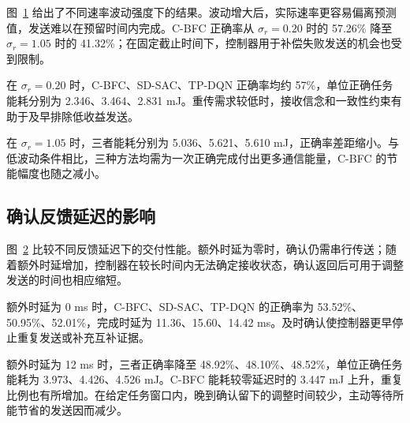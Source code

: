 图~\ref{rq3:fig:fading} 给出了不同速率波动强度下的结果。波动增大后，实际速率更容易偏离预测值，发送难以在预留时间内完成。C-BFC 正确率从 $\sigma_r=0.20$ 时的 57.26\% 降至 $\sigma_r=1.05$ 时的 41.32\%；在固定截止时间下，控制器用于补偿失败发送的机会也受到限制。

\begin{figure}[!htbp]
  \centering
  \par{}
  \label{rq3:fig:fading}
\end{figure}

在 $\sigma_r=0.20$ 时，C-BFC、SD-SAC、TP-DQN 正确率均约 57\%，单位正确任务能耗分别为 2.346、3.464、2.831 mJ。重传需求较低时，接收信念和一致性约束有助于及早排除低收益发送。

在 $\sigma_r=1.05$ 时，三者能耗分别为 5.036、5.621、5.610 mJ，正确率差距缩小。与低波动条件相比，三种方法均需为一次正确完成付出更多通信能量，C-BFC 的节能幅度也随之减小。

\FloatBarrier
\subsection{确认反馈延迟的影响}
\label{rq3:subsec:feedback-results}

图~\ref{rq3:fig:feedback} 比较不同反馈延迟下的交付性能。额外时延为零时，确认仍需串行传送；随着额外时延增加，控制器在较长时间内无法确定接收状态，确认返回后可用于调整发送的时间也相应缩短。

\begin{figure}[!htbp]
  \centering
  \par\vspace{2pt}{\footnotesize 四个子图依次对应正确完成率、单位正确任务能耗、重复发送比例和通信完成时延。}
  \label{rq3:fig:feedback}
\end{figure}

额外时延为 0 ms 时，C-BFC、SD-SAC、TP-DQN 的正确率为 53.52\%、50.95\%、52.01\%，完成时延为 11.36、15.60、14.42 ms。及时确认使控制器更早停止重复发送或补充互补证据。

额外时延为 12 ms 时，三者正确率降至 48.92\%、48.10\%、48.52\%，单位正确任务能耗为 3.973、4.426、4.526 mJ。C-BFC 能耗较零延迟时的 3.447 mJ 上升，重复比例也有所增加。在给定任务窗口内，晚到确认留下的调整时间较少，主动等待所能节省的发送因而减少。

